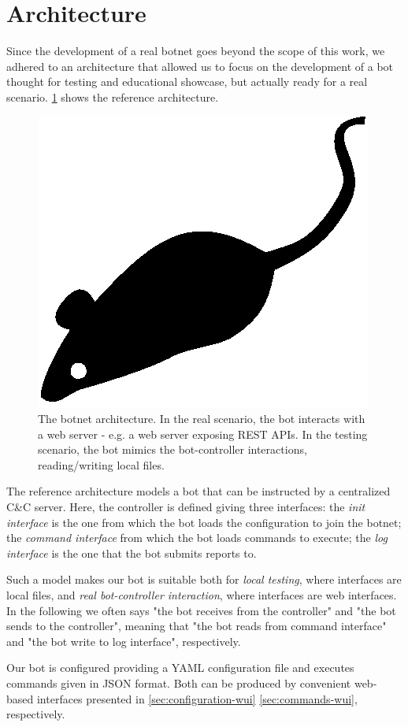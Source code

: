 \section{Architecture}
\label{sec:architecture}

Since the development of a real botnet goes beyond the scope of this work, we adhered to an architecture that allowed us to focus on the development of a bot thought for testing and educational showcase, but actually ready for a real scenario. \ref{fig:botnet-architecture} shows the reference architecture.

\begin{figure}[tp]
  \centering
  \includegraphics{./fig/acmlarge-mouse}
  \caption{The botnet architecture. In the real scenario, the bot interacts with a web server - e.g. a web server exposing REST APIs. In the testing scenario, the bot mimics the bot-controller interactions, reading/writing local files.}
    \label{fig:botnet-architecture}
\end{figure}

The reference architecture models a bot that can be instructed by a centralized C\&C server.
Here, the controller is defined giving three interfaces: the \textit{init interface} is the one from which the bot loads the configuration to join the botnet; the \textit{command interface} from which the bot loads commands to execute; the \textit{log interface} is the one that the bot submits reports to.

Such a model makes our bot is suitable both for \textit{local testing}, where interfaces are local files, and \textit{real bot-controller interaction}, where interfaces are web interfaces. In the following we often says "the bot receives from the controller" and "the bot sends to the controller", meaning that "the bot reads from command interface" and "the bot write to log interface", respectively.

Our bot is configured providing a YAML configuration file and executes commands given in JSON format. Both can be produced by convenient web-based interfaces presented in \ref{sec:configuration-wui} \ref{sec:commands-wui}, respectively.
